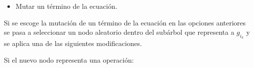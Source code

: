 \begin{itemize}
\begin{center}
\begin{adjustbox}{width=0.35\textwidth, keepaspectratio}
%
              \end{adjustbox}
          \end{center}

    \item Mutar un término de la ecuación.
\end{itemize}

Si se escoge la mutación de un término de la ecuación en las opciones anteriores se pasa a seleccionar un nodo aleatorio dentro del subárbol que representa a $g_{i_k}$ y se aplica una de las siguientes modificaciones.

Si el nuevo nodo representa una operación:

